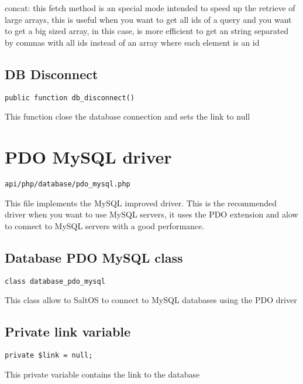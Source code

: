 \documentclass[a4paper]{book}
\begin{document}
concat: this fetch method is an special mode intended to speed up the retrieve of large
arrays, this is useful when you want to get all ids of a query and you want to get a big
sized array, in this case, is more efficient to get an string separated by commas with all
ids instead of an array where each element is an id

\hypertarget{toc369}{}
\subsection{DB Disconnect}

\begin{lstlisting}
public function db_disconnect()
\end{lstlisting}

This function close the database connection and sets the link to null

\hypertarget{toc370}{}
\section{PDO MySQL driver}

\begin{lstlisting}
api/php/database/pdo_mysql.php
\end{lstlisting}

This file implements the MySQL improved driver. This is the recommended driver when you want
to use MySQL servers, it uses the PDO extension and alow to connect to MySQL servers with a
good performance.

\hypertarget{toc371}{}
\subsection{Database PDO MySQL class}

\begin{lstlisting}
class database_pdo_mysql
\end{lstlisting}

This class allow to SaltOS to connect to MySQL databases using the PDO driver

\hypertarget{toc372}{}
\subsection{Private link variable}

\begin{lstlisting}
private $link = null;
\end{lstlisting}

This private variable contains the link to the database
\end{document}
